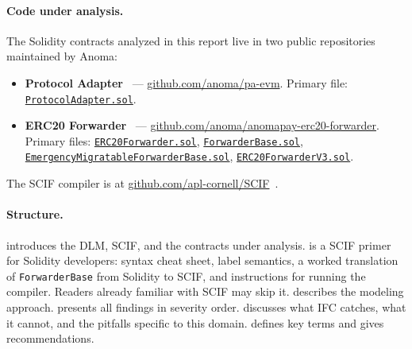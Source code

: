 \documentclass[11pt,a4paper]{article}
\begin{document}
\paragraph{Code under analysis.}
The Solidity contracts analyzed in this report live in two public
repositories maintained by Anoma:
\begin{itemize}
  \item \textbf{Protocol Adapter}~\cite{paevmrepo} ---
    \href{https://github.com/anoma/pa-evm}{github.com/anoma/pa-evm}.
    Primary file:
    \href{https://github.com/anoma/pa-evm/blob/main/contracts/src/ProtocolAdapter.sol}{\texttt{ProtocolAdapter.sol}}.
  \item \textbf{ERC20 Forwarder}~\cite{forwarderrepo} ---
    \href{https://github.com/anoma/anomapay-erc20-forwarder}{github.com/anoma/anomapay-erc20-forwarder}.
    Primary files:
    \href{https://github.com/anoma/anomapay-erc20-forwarder/blob/main/contracts/src/ERC20Forwarder.sol}{\texttt{ERC20Forwarder.sol}},
    \href{https://github.com/anoma/anomapay-erc20-forwarder/blob/main/contracts/src/bases/ForwarderBase.sol}{\texttt{ForwarderBase.sol}},
    \href{https://github.com/anoma/anomapay-erc20-forwarder/blob/main/contracts/src/bases/EmergencyMigratableForwarderBase.sol}{\texttt{EmergencyMigratableForwarderBase.sol}},
    \href{https://github.com/anoma/anomapay-erc20-forwarder/blob/main/contracts/src/drafts/ERC20ForwarderV3.sol}{\texttt{ERC20ForwarderV3.sol}}.
\end{itemize}
The SCIF compiler is at
\href{https://github.com/apl-cornell/SCIF}{github.com/apl-cornell/SCIF}~\cite{scifrepo}.

\paragraph{Structure.}  introduces the DLM, SCIF, and the
contracts under analysis.  is a SCIF primer for Solidity
developers: syntax cheat sheet, label semantics, a worked translation of
\texttt{ForwarderBase} from Solidity to SCIF, and instructions for running the
compiler. Readers already familiar with SCIF may skip it.
 describes the modeling approach.
 presents all findings in severity order.
 discusses what IFC catches, what it cannot, and the
pitfalls specific to this domain.  defines key terms and
 gives recommendations.

\end{document}
